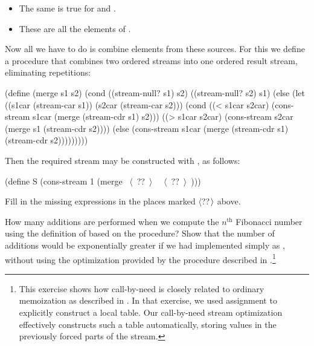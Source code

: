 \begin{exerciseGroup}
\begin{itemize}
\item
The same is true for 
and .

\item
These are all the elements of .
\end{itemize}

Now all we have to do is combine elements from these sources.  For this we
define a procedure  that combines two ordered streams into one
ordered result stream, eliminating repetitions:

\begin{codeBlock}
(define (merge s1 s2)
  (cond ((stream-null? s1) s2)
        ((stream-null? s2) s1)
        (else
         (let ((s1car (stream-car s1))
               (s2car (stream-car s2)))
           (cond ((< s1car s2car)
                  (cons-stream
                   s1car
                   (merge (stream-cdr s1) s2)))
                 ((> s1car s2car)
                  (cons-stream
                   s2car
                   (merge s1 (stream-cdr s2))))
                 (else
                  (cons-stream
                   s1car
                   (merge (stream-cdr s1)
                          (stream-cdr s2)))))))))
\end{codeBlock}

Then the required stream may be constructed with , as follows:

\begin{codeBlock}
(define S (cons-stream 1 (merge ~\(\langle \)~??~\(\rangle \)~ ~\(\langle \)~??~\(\rangle \)~)))
\end{codeBlock}

Fill in the missing expressions in the places marked \( \langle \)??\( \kern0.08em\rangle \) above.

\label{Exercise 3.57}
 How many additions are performed
when we compute the \( n^{\mathrm{th}} \) Fibonacci number using the definition of
 based on the  procedure?  Show that the number of
additions would be exponentially greater if we had implemented  simply as , without using the
optimization provided by the  procedure described in
.\footnote{This exercise shows how call-by-need is closely related
to ordinary memoization as described in .  In that exercise,
we used assignment to explicitly construct a local table.  Our call-by-need
stream optimization effectively constructs such a table automatically, storing
values in the previously forced parts of the stream.}


\end{exerciseGroup}
